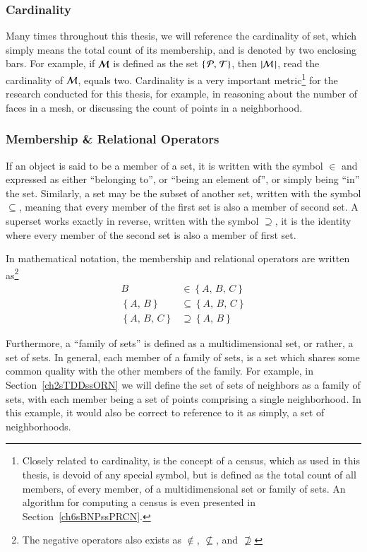 %
%
\subsubsection{Cardinality}
\label{ch2sETBssSTsssC}
Many times throughout this thesis, we will reference the cardinality of set, which simply means the total count of its membership, and is denoted by two enclosing bars. For example, if $\mathcal{M}$ is defined as the set $\left \{\,\mathcal{P},\,\mathcal{T}\right \}$, then $|\mathcal{M}\,| $, read the cardinality of $\mathcal{M}$, equals two. Cardinality is a very important metric\footnote{Closely related to cardinality, is the concept of a census, which as used in this thesis, is devoid of any special symbol, but is defined as the total count of all members, of every member, of a multidimensional set or family of sets. An algorithm for computing a census is even presented in Section~\ref{ch6sBNPssPRCN}.} for the research conducted for this thesis, for example, in reasoning about the number of faces in a mesh, or discussing the count of points in a neighborhood.

%
%
\subsubsection{Membership \& Relational Operators}
\label{ch2sETBssSTsssMRO}
If an object is said to be a member of a set, it is written with the symbol $\in$ and expressed as either ``belonging to'', or ``being an element of'', or simply being ``in'' the set. Similarly, a set may be the subset of another set, written with the symbol $\subseteq$, meaning that every member of the first set is also a member of second set. A superset works exactly in reverse, written with the symbol $\supseteq$, it is the identity where every member of the second set is also a member of first set.

In mathematical notation, the membership and relational operators are written as\footnote{The negative operators also exists as $\notin$, $\nsubseteq$, and  $\nsupseteq$}
\begin{align}
	B & \in \left \{A,\,B,\,C\right \} \\
	\left \{A,\,B\right \} & \subseteq \left \{A,\,B,\,C\right \} \\
	\left \{A,\,B,\,C\right \} & \supseteq \left \{A,\,B\right \}
\end{align}

Furthermore, a ``family of sets'' is defined as a multidimensional set, or rather, a set of sets. In general, each member of a family of sets, is a set which shares some common quality with the other members of the family. For example, in Section~\ref{ch2sTDDssORN} we will define the set of sets of neighbors as a family of sets, with each member being a set of points comprising a single neighborhood. In this example, it would also be correct to reference to it as simply, a set of neighborhoods.

